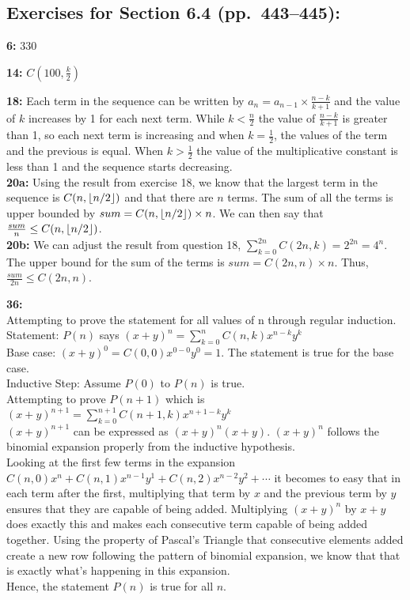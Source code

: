\documentclass[12pt]{article}  %
\DeclarePairedDelimiter\floor{\lfloor}{\rfloor}
\begin{document}
{{%

\subsection*{Exercises for Section 6.4 (pp.\ 443--445):}     

\noindent
{\bf 6:} 
$330$

\noindent
{\bf 14:} 
$C(100, \frac{k}{2})$

\noindent
{\bf 18:}
{\normalfont
Each term in the sequence can be written by $a_{n} = a_{n-1} \times \frac{n - k}{k + 1}$ and 
the value of $k$ increases by 1 for each next term. While $k < \frac{n}{2}$ the value of 
$\frac{n - k}{k + 1}$ is greater than 1, so each next term is increasing and when $k = \frac{1}{2}$, the values
of the term and the previous is equal. When $k > \frac{1}{2}$ the value of the multiplicative
constant is less than 1 and the sequence starts decreasing.
}
\\
\noindent
{\bf 20a:}
{\normalfont 
Using the result from exercise 18, we know that the largest term in the 
sequence is $C(n, \floor*{n/2})$ and that there are $n$ terms. The sum of 
all the terms is upper bounded by $sum = C(n, \floor*{n/2}) \times n$. We 
can then say that $\frac{sum}{n} \leq C(n, \floor*{n/2})$.
}
\\
{\bf 20b:}
{\normalfont 
We can adjust the result from question 18, $\sum_{k=0}^{2n} C(2n, k) = 2^{2n} = 4^n$.
The upper bound for the sum of the terms is $sum = C(2n, n) \times n$. 
Thus, $\frac{sum}{2n} \leq C(2n, n)$.
}

\noindent
{\bf 36:} 
\\
{\normalfont
Attempting to prove the statement for all values of n through 
regular induction. 
\\
Statement: $P(n)$ says $(x+y)^n = \sum_{k=0}^{n} C(n, k)x^{n-k}y^k$
\\
Base case: $(x+y)^0 = C(0, 0)x^{0-0}y^0 = 1$. The statement is true for the
base case.
\\
Inductive Step: Assume $P(0)$ to $P(n)$ is true.
\\
Attempting to prove $P(n+1)$ which is $(x+y)^{n+1} = \sum_{k=0}^{n+1} C(n+1, k)x^{n+1-k}y^k$
\\
$(x+y)^{n+1}$ can be expressed as $(x+y)^n(x+y)$. $(x+y)^n$ follows the 
binomial expansion properly from the inductive hypothesis.
\\
Looking at the first few terms in the expansion $C(n, 0)x^{n} + C(n, 1)x^{n-1}y^1 + C(n, 2)x^{n-2}y^2 + \cdots$
it becomes to easy that in each term after the first, multiplying that term by $x$ and 
the previous term by $y$ ensures that they are capable of being added. Multiplying 
$(x+y)^n$ by $x+y$ does exactly this and makes each consecutive term capable of being 
added together. Using the property of Pascal's Triangle that consecutive elements added 
create a new row following the pattern of binomial expansion, we know that that 
is exactly what's happening in this expansion.
\\
Hence, the statement $P(n)$ is true for all $n$.
}

}}
\end{document}
